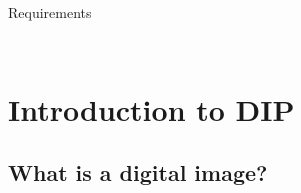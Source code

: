 \documentclass{beamer}
\begin{document}
\begin{frame}
\begin{block}{Requirements}
\begin{columns}
\begin{column}{.3\linewidth}
{\begin{figure}
          \end{figure}}
      \end{column}
    \end{columns}    
  \end{block}
\end{frame}

\section{Introduction to DIP}

\subsection{What is a digital image?}
\end{document}
